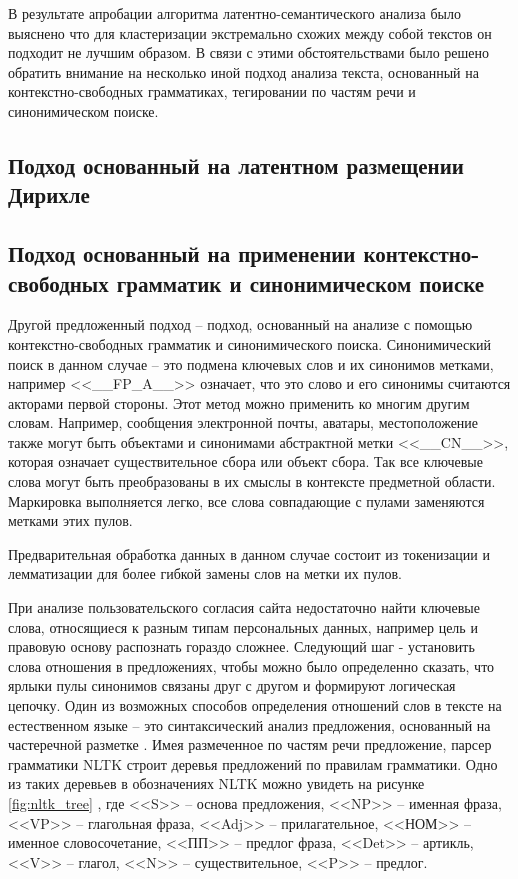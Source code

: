 \documentclass[../main]{subfiles}
\begin{document}
В результате апробации алгоритма латентно-семантического анализа было выяснено что для кластеризации экстремально схожих между собой текстов он  подходит не лучшим образом. В связи с этими обстоятельствами было решено обратить внимание на несколько иной подход анализа текста, основанный на контекстно-свободных грамматиках, тегировании по частям речи и синонимическом поиске.

\subsection{Подход основанный на латентном размещении Дирихле}

\subsection{Подход основанный на применении контекстно-свободных грамматик и синонимическом поиске}

Другой предложенный подход -- подход, основанный на анализе с помощью контекстно-свободных грамматик и синонимического поиска. Синонимический поиск в данном случае -- это подмена ключевых слов и их синонимов метками, например <<\_\_FP\_A\_\_>> означает, что это слово и его синонимы считаются акторами первой стороны. Этот метод можно применить ко многим другим словам. Например, сообщения электронной почты, аватары, местоположение также могут быть объектами и синонимами абстрактной метки <<\_\_CN\_\_>>, которая означает существительное сбора или объект сбора. Так все ключевые слова могут быть преобразованы в их смыслы в контексте предметной области. Маркировка выполняется легко, все слова совпадающие с пулами заменяются метками этих пулов.

Предварительная обработка данных в данном случае состоит из токенизации и лемматизации для более гибкой замены слов на метки их пулов.

При анализе пользовательского согласия сайта недостаточно найти ключевые слова, относящиеся к разным типам персональных данных, например цель и правовую основу распознать гораздо сложнее. Следующий шаг - установить слова отношения в предложениях, чтобы можно было определенно сказать, что ярлыки пулы синонимов связаны друг с другом и формируют логическая цепочку. Один из возможных способов определения отношений слов в тексте на естественном языке -- это синтаксический анализ предложения, основанный на частеречной разметке \cite{POS}. Имея размеченное по частям речи предложение, парсер грамматики NLTK \cite{NLTK} строит деревья предложений по правилам грамматики. Одно из таких деревьев в обозначениях NLTK можно увидеть на рисунке \ref{fig:nltk_tree} \cite{NLTK}, где <<S>> -- основа предложения, <<NP>> -- именная фраза, <<VP>> -- глагольная фраза, <<Adj>> -- прилагательное, <<НОМ>> -- именное словосочетание, <<ПП>> -- предлог фраза, <<Det>> -- артикль, <<V>> -- глагол, <<N>> -- существительное, <<P>> -- предлог.
\end{document}

